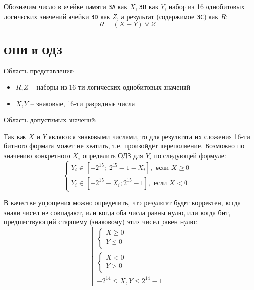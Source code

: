 \documentclass[11pt,a4paper]{article}
\begin{document}
Обозначим число в ячейке памяти \texttt{3A} как $X$, \texttt{3B} как $Y$, набор из 16 однобитовых логических значений ячейки \texttt{3D} как $Z$, а результат (содержимое \texttt{3С}) как $R$:
\begin{equation}
R = (X + Y) \lor Z
\end{equation}
\subsection{ОПИ и ОДЗ}
Область представления:
\begin{itemize}
	\item $R, Z$ -- наборы из 16-ти логических однобитовых значений
	\item $X, Y$ --	 знаковые, 16-ти разрядные числа
\end{itemize}

Область допустимых значений:

Так как $X$ и $Y$ являются знаковыми числами, то для результата их сложения 16-ти битного формата может не хватить, т.е. произойдёт переполнение. Возможно по значению конкретного $X_i$ определить ОДЗ для $Y_i$ по следующей формуле:
\begin{equation}
\begin{cases}
Y_i \in [-2^{15}; \;2^{15} - 1 - X_i], \text{ если } X \geqslant 0\\
Y_i \in [-2^{15} - X_i; 2^{15} - 1], \text{ если } X < 0
\end{cases}
\end{equation}

В качестве упрощения можно определить, что результат будет корректен, когда знаки чисел не совпадают, или когда оба числа равны нулю, или когда бит, предшествующий старшему (знаковому) этих чисел  равен нулю:
\begin{equation}
\left[
\begin{gathered}
\begin{cases}
X \geqslant 0\\
Y\leqslant 0\\
\end{cases}\\
\begin{cases}
X < 0\\
Y> 0\\
\end{cases}\\
-2^{14} \leqslant X, Y \leqslant 2^{14} - 1
\end{gathered}
\right.
\end{equation}
\end{document}
